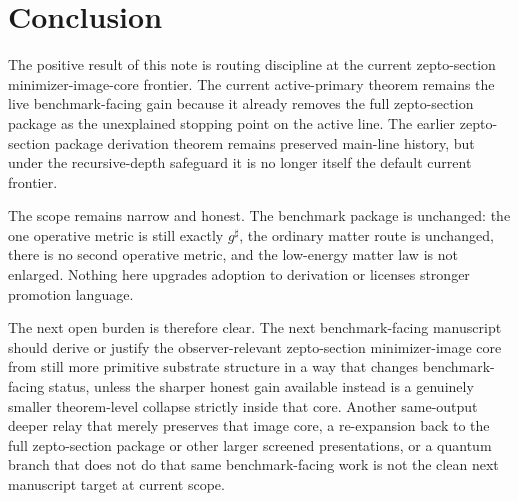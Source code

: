 \documentclass[11pt]{article}
\newcommand{\CompletedMetric}{g^{\sharp}}
\begin{document}
\section{Conclusion}

The positive result of this note is routing discipline at the current zepto-section minimizer-image-core frontier. The current active-primary theorem remains the live benchmark-facing gain because it already removes the full zepto-section package as the unexplained stopping point on the active line. The earlier zepto-section package derivation theorem remains preserved main-line history, but under the recursive-depth safeguard it is no longer itself the default current frontier.

The scope remains narrow and honest. The benchmark package is unchanged: the one operative metric is still exactly \(\CompletedMetric\), the ordinary matter route is unchanged, there is no second operative metric, and the low-energy matter law is not enlarged. Nothing here upgrades adoption to derivation or licenses stronger promotion language.

The next open burden is therefore clear. The next benchmark-facing manuscript should derive or justify the observer-relevant zepto-section minimizer-image core from still more primitive substrate structure in a way that changes benchmark-facing status, unless the sharper honest gain available instead is a genuinely smaller theorem-level collapse strictly inside that core. Another same-output deeper relay that merely preserves that image core, a re-expansion back to the full zepto-section package or other larger screened presentations, or a quantum branch that does not do that same benchmark-facing work is not the clean next manuscript target at current scope.
\end{document}
